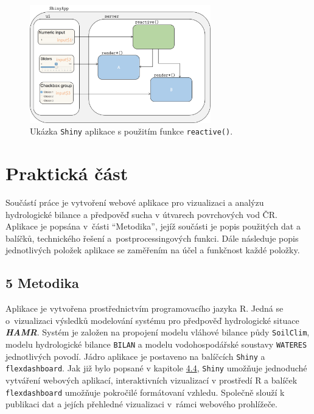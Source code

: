 \documentclass[12pt,]{article}
\begin{document}
\begin{figure}[H]
  \centering
      \includegraphics[width=0.7\textwidth]{fig/shiny}
      \caption{Ukázka \texttt{Shiny} aplikace s použitím funkce \texttt{reactive()}.} 
      \label{fig:ch4.4}
\end{figure}

\section*{Praktická část}\label{prakticka-cast}

\qquad Součástí práce je vytvoření webové aplikace pro vizualizaci a
analýzu hydrologické bilance a předpověď sucha v útvarech povrchových
vod ČR. Aplikace je popsána v~části \enquote{Metodika}, jejíž součásti
je popis použitých dat a balíčků, technického řešení
a~postprocessingových funkci. Dále následuje popis jednotlivých položek
aplikace se zaměřením na účel a funkčnost každé položky.

\subsection{5 Metodika}\label{metodika}

\qquad Aplikace je vytvořena prostřednictvím programovacího jazyka R.
Jedná se o~vizualizaci výsledků modelování systému pro předpověď
hydrologické situace \textbf{\emph{HAMR}}. Systém je založen na
propojení modelu vláhové bilance půdy \texttt{SoilClim}, modelu
hydrologické bilance \texttt{BILAN} a modelu vodohospodářské soustavy
\texttt{WATERES} jednotlivých povodí. Jádro aplikace je postaveno na
balíčcích \texttt{Shiny} a \texttt{flexdashboard}. Jak již bylo popsané
v kapitole \protect\hyperlink{webviz}{4.4}, \texttt{Shiny} umožňuje
jednoduché vytváření webových aplikací, interaktivních vizualizací v
prostředí R a balíček \texttt{flexdashboard} umožňuje pokročilé
formátovaní vzhledu. Společně slouží k publikaci dat a jejích přehledné
vizualizaci v~rámci webového prohlížeče.
\end{document}
